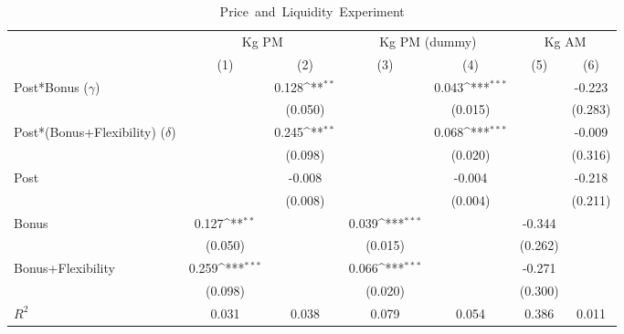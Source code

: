 {
\def\sym#1{\ifmmode^{#1}\else\(^{#1}\)\fi}
\begin{longtable}{l*{6}{c}}
\caption{\mbox{Price and Liquidity Experiment} \label{tab-bonus}}\\
\hline\hline\endfirsthead\hline\endhead\hline\endfoot\endlastfoot
                &\multicolumn{2}{c}{Kg PM}            &\multicolumn{2}{c}{Kg PM (dummy)}    &\multicolumn{2}{c}{Kg AM}            \\\cmidrule(lr){2-3}\cmidrule(lr){4-5}\cmidrule(lr){6-7}
                &\multicolumn{1}{c}{(1)}         &\multicolumn{1}{c}{(2)}         &\multicolumn{1}{c}{(3)}         &\multicolumn{1}{c}{(4)}         &\multicolumn{1}{c}{(5)}         &\multicolumn{1}{c}{(6)}         \\
\hline
Post*Bonus ($\gamma$)&                  &    0.128\sym{**} &                  &    0.043\sym{***}&                  &   -0.223         \\
                &                  &  (0.050)         &                  &  (0.015)         &                  &  (0.283)         \\
Post*(Bonus+Flexibility) ($\delta$)&                  &    0.245\sym{**} &                  &    0.068\sym{***}&                  &   -0.009         \\
                &                  &  (0.098)         &                  &  (0.020)         &                  &  (0.316)         \\
Post            &                  &   -0.008         &                  &   -0.004         &                  &   -0.218         \\
                &                  &  (0.008)         &                  &  (0.004)         &                  &  (0.211)         \\
Bonus           &    0.127\sym{**} &                  &    0.039\sym{***}&                  &   -0.344         &                  \\
                &  (0.050)         &                  &  (0.015)         &                  &  (0.262)         &                  \\
Bonus+Flexibility&    0.259\sym{***}&                  &    0.066\sym{***}&                  &   -0.271         &                  \\
                &  (0.098)         &                  &  (0.020)         &                  &  (0.300)         &                  \\
\hline
\(R^{2}\)       &    0.031         &    0.038         &    0.079         &    0.054         &    0.386         &    0.011         \\

\end{longtable}}
